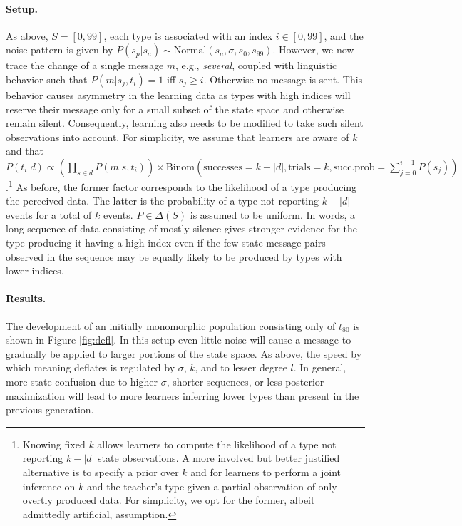 \documentclass[10pt,a4paper]{article}
\begin{document}
\paragraph{Setup.} As above, $S = [0,99]$, each type is associated with an index $i \in [0,99]$,
and the noise pattern is given by $P(s_p|s_a) \sim \text{Normal}(s_{a},\sigma,s_{0},s_{99})$. However, we
now trace the change of a single message $m$, e.g., {\em several}, coupled with linguistic behavior such that
$P(m|s_j,t_i) = 1$ iff $s_j \geq i$. Otherwise no message is sent. This behavior
causes asymmetry in the learning data as types with high indices will reserve their message
only for a small subset of the state space and otherwise remain silent. Consequently, learning
also needs to be modified to take such silent observations into account. For simplicity, we
assume that learners are aware of $k$ and that
$P(t_i | d) \propto (\prod_{s \in d} P(m|s,t_i)) \times \text{Binom}(\text{successes} =
k-|d|, \text{trials} = k, \text{succ.prob} = \sum_{j=0}^{i-1} P(s_j))$.\footnote{Knowing fixed $k$ allows learners to compute the likelihood of a type not reporting $k -|d|$ state observations. A more involved but better justified alternative is to specify a prior over $k$ and for learners to perform a joint inference on $k$ and the teacher's type given a partial observation of only overtly produced data. For simplicity, we opt for the former, albeit admittedly artificial, assumption.}
As before, the former factor corresponds to the likelihood of a type producing the perceived 
data.  The latter is the probability of a type not reporting $k-|d|$ events for a
total of $k$ events. $P \in \Delta(S)$ is assumed to be uniform. In words, a long sequence of
data consisting of mostly silence gives stronger evidence for the type producing it having a
high index even if the few state-message pairs observed in the sequence may be equally
likely to be produced by types with lower indices.

\paragraph{Results.} The development of an initially monomorphic population consisting only of $t_{80}$ is shown in Figure \ref{fig:defl}. In this setup even little noise will cause a message to gradually be applied to larger portions of the state space. As above, the speed by which meaning deflates is regulated by $\sigma$, $k$, and to lesser degree $l$. In general, more state confusion due to higher $\sigma$, shorter sequences, or less posterior maximization will lead to more learners inferring lower types than present in the previous generation. 
\end{document}
